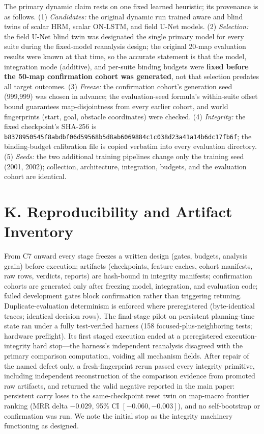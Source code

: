 \documentclass[letterpaper]{article} %
\newcommand{\stage}[1]{\textsc{#1}}
\begin{document}
The primary dynamic claim rests on one fixed learned heuristic; its provenance is as follows. (1) \emph{Candidates:} the original dynamic run trained aware and blind twins of scalar HRM, scalar ON-LSTM, and field U-Net models. (2) \emph{Selection:} the field U-Net blind twin was designated the single primary model for every suite during the fixed-model reanalysis design; the original 20-map evaluation results were known at that time, so the accurate statement is that the model, integration mode (additive), and per-suite binding budgets were \textbf{fixed before the 50-map confirmation cohort was generated}, not that selection predates all target outcomes. (3) \emph{Freeze:} the confirmation cohort's generation seed (999{,}999) was chosen in advance; the evaluation-seed formula's within-suite offset bound guarantees map-disjointness from every earlier cohort, and world fingerprints (start, goal, obstacle coordinates) were checked. (4) \emph{Integrity:} the fixed checkpoint's SHA-256 is \texttt{b8378950545f8abd\allowbreak bf06d59568b5d8ab\allowbreak 6069884c1c038d23\allowbreak a41a14b6dc17fb6f}; the binding-budget calibration file is copied verbatim into every evaluation directory. (5) \emph{Seeds:} the two additional training pipelines change only the training seed (2001, 2002); collection, architecture, integration, budgets, and the evaluation cohort are identical.

\section{K. Reproducibility and Artifact Inventory}

From \stage{C7} onward every stage freezes a written design (gates, budgets, analysis grain) before execution; artifacts (checkpoints, feature caches, cohort manifests, raw rows, verdicts, reports) are hash-bound in integrity manifests; confirmation cohorts are generated only after freezing model, integration, and evaluation code; failed development gates block confirmation rather than triggering retuning. Duplicate-evaluation determinism is enforced where preregistered (byte-identical traces; identical decision rows). The final-stage pilot on persistent planning-time state ran under a fully test-verified harness (158 focused-plus-neighboring tests; hardware preflight). Its first staged execution ended at a preregistered execution-integrity hard stop---the harness's independent reanalysis disagreed with the primary comparison computation, voiding all mechanism fields. After repair of the named defect only, a fresh-fingerprint rerun passed every integrity primitive, including independent reconstruction of the comparison evidence from promoted raw artifacts, and returned the valid negative reported in the main paper: persistent carry loses to the same-checkpoint reset twin on map-macro frontier ranking (MRR delta $-0.029$, 95\% CI $[-0.060,-0.003]$), and no self-bootstrap or confirmation was run. We note the initial stop as the integrity machinery functioning as designed.
\end{document}
